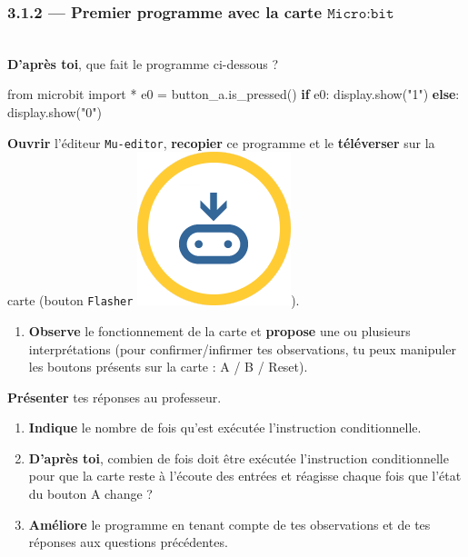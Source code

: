\documentclass[a4paper,17pt]{extarticle}
\newenvironment{eleve}%
{\begin{activite}\color{noiramu}\\[-0.5cm]}
{\end{activite}}
\providecommand{\tightlist}{%
      \setlength{\itemsep}{0pt}\setlength{\parskip}{0pt}}
\newenvironment{Shaded}{}{}
\newcommand{\StringTok}[1]{\textcolor[rgb]{0.25,0.44,0.63}{{#1}}}
\newcommand{\NormalTok}[1]{{#1}}
\newcommand{\ImportTok}[1]{{#1}}
\newcommand{\ControlFlowTok}[1]{\textcolor[rgb]{0.00,0.44,0.13}{\textbf{{#1}}}}
\newcommand{\OperatorTok}[1]{\textcolor[rgb]{0.40,0.40,0.40}{{#1}}}
\begin{document}
    \hypertarget{premier-programme-avec-la-carte-textttmicrobit}{%
\subsubsection{\texorpdfstring{3.1.2 --- Premier programme avec la carte
\(\texttt{Micro:bit}\)}{3.1.2 --- Premier programme avec la carte \textbackslash texttt\{Micro:bit\}}}\label{premier-programme-avec-la-carte-textttmicrobit}}
\begin{eleve}
    \textbf{D'après toi}, que fait le programme ci-dessous ?

\begin{Shaded}
\begin{Highlighting}[]
\ImportTok{from}\NormalTok{ microbit }\ImportTok{import} \OperatorTok{*}
\NormalTok{e0 }\OperatorTok{=}\NormalTok{ button\_a.is\_pressed()}
\ControlFlowTok{if}\NormalTok{ e0:}
\NormalTok{    display.show(}\StringTok{"1"}\NormalTok{)}
\ControlFlowTok{else}\NormalTok{:}
\NormalTok{    display.show(}\StringTok{"0"}\NormalTok{)}
\end{Highlighting}
\end{Shaded}

\textbf{Ouvrir} l'éditeur \texttt{Mu-editor}, \textbf{recopier} ce
programme et le \textbf{téléverser} sur la carte (bouton
\texttt{Flasher} \includegraphics{res/flash.png}).

\begin{enumerate}
\def\labelenumi{\arabic{enumi}.}
\setcounter{enumi}{1}
\tightlist
\item
  \textbf{Observe} le fonctionnement de la carte et \textbf{propose} une
  ou plusieurs interprétations (pour confirmer/infirmer tes
  observations, tu peux manipuler les boutons présents sur la carte : A
  / B / Reset).
\end{enumerate}

\textbf{Présenter} tes réponses au professeur.

\begin{enumerate}
\def\labelenumi{\arabic{enumi}.}
\setcounter{enumi}{2}
\tightlist
\item
  \textbf{Indique} le nombre de fois qu'est exécutée l'instruction
  conditionnelle.
\item
  \textbf{D'après toi}, combien de fois doit être exécutée l'instruction
  conditionnelle pour que la carte reste à l'écoute des entrées et
  réagisse chaque fois que l'état du bouton A change ?
\item
  \textbf{Améliore} le programme en tenant compte de tes observations et
  de tes réponses aux questions précédentes.
\end{enumerate}


\end{eleve}
\end{document}
